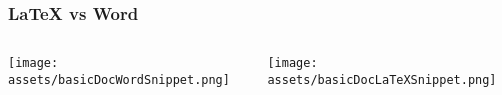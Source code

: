 \begin{frame}
    \frametitle{\LaTeX{} vs Word}

    \begin{columns}
        \begin{column}{0.5\textwidth}
            \texttt{[image: assets/basicDocWordSnippet.png]}
        \end{column}
        \begin{column}{0.5\textwidth}
            \texttt{[image: assets/basicDocLaTeXSnippet.png]}
        \end{column}
    \end{columns}
\end{frame}
